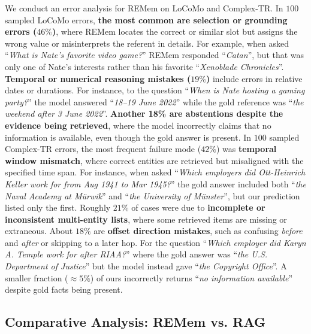\documentclass{article} %
\newcommand{\ours}{REMem\xspace}
\begin{document}
We conduct an error analysis for \ours on LoCoMo and Complex-TR.
In $100$ sampled LoCoMo errors, \textbf{the most common are selection or grounding errors ($46\%$)}, where \ours locates the correct or similar slot but assigns the wrong value or misinterprets the referent in details. For example, when asked ``\textit{What is Nate’s favorite video game?}'' \ours responded ``\textit{Catan}'', but that was only one of Nate's interests rather than his favorite ``\textit{Xenoblade Chronicles}''. 
\textbf{Temporal or numerical reasoning mistakes ($19\%$)} include errors in relative dates or durations. For instance, to the question ``\textit{When is Nate hosting a gaming party?}'' the model answered ``\textit{18–19 June 2022}'' while the gold reference was ``\textit{the weekend after 3 June 2022}''. 
\textbf{Another 18\% are abstentions despite the evidence being retrieved}, where the model incorrectly claims that no information is available, even though the gold answer is present.
In $100$ sampled Complex-TR errors, the most frequent failure mode ($42\%$) was \textbf{temporal window mismatch}, where correct entities are retrieved but misaligned with the specified time span. 
For instance, when asked ``\textit{Which employers did Ott-Heinrich Keller work for from Aug 1941 to Mar 1945?}'' the gold answer included both ``\textit{the Naval Academy at Mürwik}'' and ``\textit{the University of Münster}'', but our prediction listed only the first. 
Roughly $21\%$ of cases were due to \textbf{incomplete or inconsistent multi-entity lists}, where some retrieved items are missing or extraneous.
About $18\%$ are \textbf{offset direction mistakes}, such as confusing \textit{before} and \textit{after} or skipping to a later hop. For the question ``\textit{Which employer did Karyn A. Temple work for after RIAA?}'' where the gold answer was ``\textit{the U.S. Department of Justice}'' but the model instead gave ``\textit{the Copyright Office}''. 
A smaller fraction ($\approx5\%$) of ours incorrectly returns ``\textit{no information available}'' despite gold facts being present.

\subsection{Comparative Analysis: \ours vs. RAG}
\end{document}
